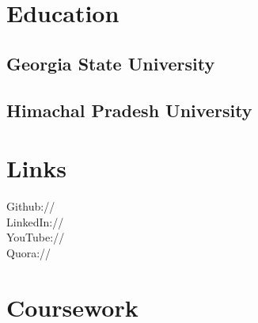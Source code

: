\documentclass[]{deedy-resume-openfont}
\begin{document}
\lastupdated



%
%

\begin{minipage}[t]{0.33\textwidth} 


\section{Education} 

\subsection{Georgia State University}
\sectionsep
\subsection{Himachal Pradesh  \break University}
\sectionsep


\section{Links} 
Github:// \href{https://github.com/ankush2611}{} \\
LinkedIn://  \href{https://www.linkedin.com/in/ankunix}{} \\
YouTube://  \href{https://www.youtube.com/user/2611ankush}{} \\
Quora://  \href{https://www.quora.com/profile/Ankush-Chauhan-1}{}
\sectionsep


\section{Coursework}

\end{minipage}
\end{document}
